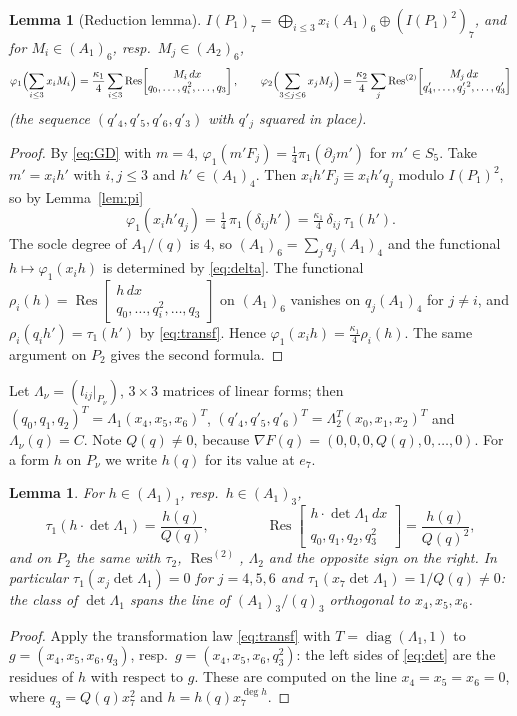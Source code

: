 \documentclass[10pt]{article}
\numberwithin{equation}{section}
\newtheorem{lemma}[theorem]{Lemma}
\theoremstyle{remark}
\newcommand{\Res}{\operatorname{Res}}
\newcommand{\gres}[2]{\Res\!\begin{bmatrix} #1 \\ #2 \end{bmatrix}}
\newcommand{\gress}[2]{\Res^{(2)}\!\begin{bmatrix} #1 \\ #2 \end{bmatrix}}
\begin{document}
\begin{lemma}[Reduction lemma]\label{lem:red}
$I(P_1)_7=\bigoplus_{i\le3}x_i(A_1)_6\oplus(I(P_1)^2)_7$, and for $M_i\in(A_1)_6$, resp.\ $M_j\in(A_2)_6$,
\begin{equation}\label{eq:red}
\varphi_1\Bigl(\sum_{i\le3}x_iM_i\Bigr)=\frac{\kappa_1}{4}\sum_{i\le3}\gres{M_i\,dx}{q_0,\dots,q_i^2,\dots,q_3},
\qquad
\varphi_2\Bigl(\sum_{3\le j\le6}x_jM_j\Bigr)=\frac{\kappa_2}{4}\sum_{j}\gress{M_j\,dx}{q'_4,\dots,q_j'^{\,2},\dots,q'_3}
\end{equation}
\textup{(}the sequence $(q'_4,q'_5,q'_6,q'_3)$ with $q'_j$ squared in place\textup{)}.
\end{lemma}
\begin{proof}
By \eqref{eq:GD} with $m=4$, $\varphi_1(m'F_j)=\frac14\pi_1(\partial_jm')$ for $m'\in S_5$. Take $m'=x_ih'$ with
$i,j\le3$ and $h'\in(A_1)_4$. Then $x_ih'F_j\equiv x_ih'q_j$ modulo $I(P_1)^2$, so by Lemma~\ref{lem:pi}
\begin{equation}\label{eq:delta}
\varphi_1(x_ih'q_j)=\tfrac14\,\pi_1(\delta_{ij}h')=\tfrac{\kappa_1}{4}\,\delta_{ij}\,\tau_1(h').
\end{equation}
The socle degree of $A_1/(q)$ is $4$, so $(A_1)_6=\sum_jq_j(A_1)_4$ and the functional $h\mapsto\varphi_1(x_ih)$
is determined by \eqref{eq:delta}. The functional $\rho_i(h)=\gres{h\,dx}{q_0,\dots,q_i^2,\dots,q_3}$ on
$(A_1)_6$ vanishes on $q_j(A_1)_4$ for $j\neq i$, and $\rho_i(q_ih')=\tau_1(h')$ by \eqref{eq:transf}. Hence
$\varphi_1(x_ih)=\frac{\kappa_1}4\rho_i(h)$. The same argument on $P_2$ gives the second formula.
\end{proof}

Let $\Lambda_\nu=(l_{ij}|_{P_\nu})$, $3\times3$ matrices of linear forms; then
$(q_0,q_1,q_2)^T=\Lambda_1(x_4,x_5,x_6)^T$, $(q'_4,q'_5,q'_6)^T=\Lambda_2^T(x_0,x_1,x_2)^T$ and
$\Lambda_\nu(q)=C$. Note $Q(q)\neq0$, because $\nabla F(q)=(0,0,0,Q(q),0,\dots,0)$. For a form $h$ on $P_\nu$ we
write $h(q)$ for its value at $e_7$.

\begin{lemma}\label{lem:det}
For $h\in(A_1)_1$, resp.\ $h\in(A_1)_3$,
\begin{equation}\label{eq:det}
\tau_1(h\cdot\det\Lambda_1)=\frac{h(q)}{Q(q)},\qquad\qquad
\gres{h\cdot\det\Lambda_1\,dx}{q_0,q_1,q_2,q_3^2}=\frac{h(q)}{Q(q)^2},
\end{equation}
and on $P_2$ the same with $\tau_2$, $\Res^{(2)}$, $\Lambda_2$ and the opposite sign on the right. In
particular $\tau_1(x_j\det\Lambda_1)=0$ for $j=4,5,6$ and $\tau_1(x_7\det\Lambda_1)=1/Q(q)\ne0$: the class of
$\det\Lambda_1$ spans the line of $(A_1)_3/(q)_3$ orthogonal to $x_4,x_5,x_6$.
\end{lemma}
\begin{proof}
Apply the transformation law \eqref{eq:transf} with $T=\operatorname{diag}(\Lambda_1,1)$ to
$g=(x_4,x_5,x_6,q_3)$, resp.\ $g=(x_4,x_5,x_6,q_3^2)$: the left sides of \eqref{eq:det} are the residues of $h$
with respect to $g$. These are computed on the line $x_4=x_5=x_6=0$, where $q_3=Q(q)x_7^2$ and
$h=h(q)x_7^{\deg h}$.
\end{proof}
\end{document}

